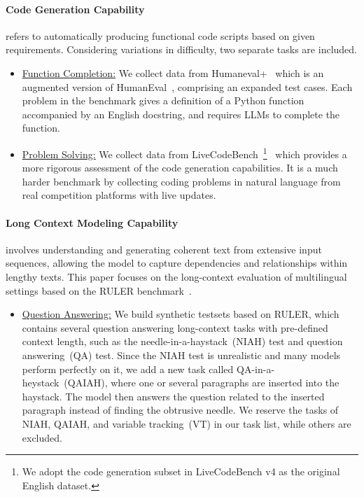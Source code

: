 \paragraph{Code Generation Capability} refers to automatically producing functional code scripts based on given requirements. Considering variations in difficulty, two separate tasks are included. 
\begin{itemize}[nosep,itemsep=1pt,leftmargin=0.1cm]
    \item \underline{Function Completion:} We collect data from Humaneval+~\cite{liu2024your} which is an augmented version of HumanEval~\cite{chen2021evaluating}, comprising an expanded test cases. Each problem in the benchmark gives a definition of a Python function accompanied by an English docstring, and requires LLMs to complete the function.
    \item \underline{Problem Solving:} We collect data from LiveCodeBench~\footnote{We adopt the code generation subset in LiveCodeBench v4 as the original English dataset.}~\cite{jain2024livecodebench} which provides a more rigorous assessment of the code generation capabilities. It is a much harder benchmark by collecting coding problems in natural language from real competition platforms with live updates.
\end{itemize}


\paragraph{Long Context Modeling Capability} involves understanding and generating coherent text from extensive input sequences, allowing the model to capture dependencies and relationships within lengthy texts. This paper focuses on the long-context evaluation of multilingual settings based on the RULER benchmark~\cite{hsieh2024ruler}.
\begin{itemize}[nosep,itemsep=1pt,leftmargin=0.1cm]
\item \underline{Question Answering:} We build synthetic testsets based on RULER, which contains several question answering long-context tasks with pre-defined context length, such as the needle-in-a-haystack~(NIAH) test and question answering~(QA) test.
Since the NIAH test is unrealistic and many models perform perfectly on it, we add a new task called QA-in-a-heystack~(QAIAH), where one or several paragraphs are inserted into the haystack. The model then answers the question related to the inserted paragraph instead of finding the obtrusive needle. We reserve the tasks of NIAH, QAIAH, and variable tracking~(VT) in our task list, while others are excluded. 
\end{itemize}


